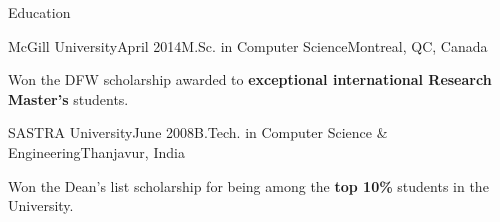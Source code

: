 \documentclass{resume} %
\begin{document}
 
\begin{rSection}{Education}

\begin{rSubsection}{McGill University}{April 2014}{M.Sc. in
Computer Science}{Montreal, QC, Canada} 
\item Won the DFW scholarship awarded to \textbf{exceptional international
        Research Master's} students.
\end{rSubsection}

\begin{rSubsection}{SASTRA University}{June 2008}{B.Tech. in Computer Science
\& Engineering}{Thanjavur, India} 
\item Won the {Dean's list scholarship} for being among the \textbf{top
10\%} students in the University. 
\end{rSubsection}

\end{rSection}

%

\end{document}

